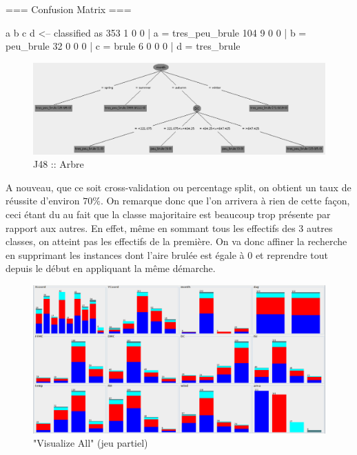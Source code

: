\documentclass{article}
\begin{document}
\begin{sffamily}
\begin{center}
\begin{boxedverbatim}
=== Confusion Matrix ===

   a   b   c   d   <-- classified as
 353   1   0   0 |   a = tres_peu_brule
 104   9   0   0 |   b = peu_brule
  32   0   0   0 |   c = brule
   6   0   0   0 |   d = tres_brule

	\end{boxedverbatim}
\end{center}

\begin{figure}[h!]
    \begin{center}
    \includegraphics[scale=0.5]{img_004.pdf}
    \caption{J48 :: Arbre}
    \end{center}	
\end{figure}

A nouveau, que ce soit cross-validation ou percentage split, on obtient un taux de réussite d'environ $70\%$.
On remarque donc que l'on arrivera à rien de cette façon, ceci étant du au fait que la classe majoritaire est beaucoup trop 
présente par rapport aux autres. En effet, même en sommant tous les effectifs des 3 autres classes, on atteint pas les effectifs 
de la première. On va donc affiner la recherche en supprimant les instances dont l'aire brulée est égale à 0 et reprendre tout 
depuis le début en appliquant la même démarche.

\begin{figure}[h!]
    \begin{center}
    \includegraphics[width=\textwidth]{img_006.pdf}
    \caption{"Visualize All" (jeu partiel)}
    \end{center}	
\end{figure}


\end{sffamily}
\end{document}
